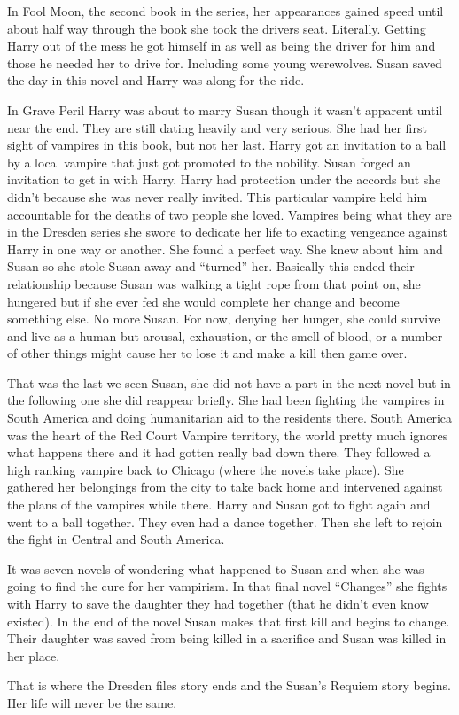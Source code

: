 \documentclass[ebook,12pt,oneside,openany]{memoir}
\begin{document}
{In Fool Moon, the second book in the series, her appearances gained speed until about half way through the book she took the drivers seat. Literally. Getting Harry out of the mess he got himself in as well as being the driver for him and those he needed her to drive for. Including some young werewolves. Susan saved the day in this novel and Harry was along for the ride.

In Grave Peril Harry was about to marry Susan though it wasn't apparent until near the end. They are still dating heavily and very serious. She had her first sight of vampires in this book, but not her last. Harry got an invitation to a ball by a local vampire that just got promoted to the nobility. Susan forged an invitation to get in with Harry. Harry had protection under the accords but she didn't because she was never really invited. This particular vampire held him accountable for the deaths of two people she loved. Vampires being what they are in the Dresden series she swore to dedicate her life to exacting vengeance against Harry in one way or another. She found a perfect way. She knew about him and Susan so she stole Susan away and ``turned'' her. Basically this ended their relationship because Susan was walking a tight rope from that point on, she hungered but if she ever fed she would complete her change and become something else. No more Susan. For now, denying her hunger, she could survive and live as a human but arousal, exhaustion, or the smell of blood, or a number of other things might cause her to lose it and make a kill then game over.

That was the last we seen Susan, she did not have a part in the next novel but in the following one she did reappear briefly. She had been fighting the vampires in South America and doing humanitarian aid to the residents there. South America was the heart of the Red Court Vampire territory, the world pretty much ignores what happens there and it had gotten really bad down there. They followed a high ranking vampire back to Chicago (where the novels take place). She gathered her belongings from the city to take back home and intervened against the plans of the vampires while there. Harry and Susan got to fight again and went to a ball together. They even had a dance together. Then she left to rejoin the fight in Central and South America.

It was seven novels of wondering what happened to Susan and when she was going to find the cure for her vampirism. In that final novel ``Changes'' she fights with Harry to save the daughter they had together (that he didn't even know existed). In the end of the novel Susan makes that first kill and begins to change. Their daughter was saved from being killed in a sacrifice and Susan was killed in her place.

That is where the Dresden files story ends and the Susan's Requiem story begins. Her life will never be the same.
}
\end{document}
